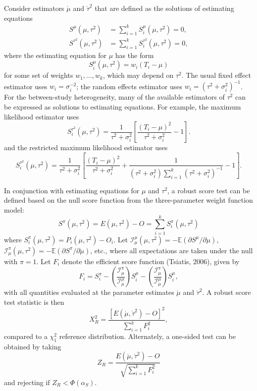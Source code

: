 \documentclass[man,floatsintext]{apa6}
\begin{document}
Consider estimators \(\acute\mu\) and \(\acute\tau^2\) that are defined as the solutions of estimating equations
\[
\begin{aligned}
S^\mu\left(\mu, \tau^2\right) &= \sum_{i=1}^k S^\mu_i \left(\mu, \tau^2\right) = 0, \\
S^{\tau^2}\left(\mu, \tau^2\right) &= \sum_{i=1}^k S^{\tau^2}_i \left(\mu, \tau^2\right) = 0,
\end{aligned}
\]
where the estimating equation for \(\mu\) has the form
\[
S_i^\mu(\mu, \tau^2) = w_i (T_i - \mu)
\]
for some set of weights \(w_1,...,w_k\), which may depend on \(\tau^2\).
The usual fixed effect estimator uses \(w_i = \sigma_i^{-2}\); the random effects estimator uses \(w_i = \left(\tau^2 + \sigma_i^2\right)^{-1}\).
For the between-study heterogeneity, many of the available estimators of \(\tau^2\) can be expressed as solutions to estimating equations.
For example, the maximum likelihood estimator uses
\[
S_i^{\tau^2}(\mu,\tau^2) = \frac{1}{\tau^2 + \sigma_i^2} \left[\frac{(T_i - \mu)^2}{\tau^2 + \sigma_i^2} - 1\right].
\]
and the restricted maximum likelihood estimator uses
\[
S_i^{\tau^2}(\mu,\tau^2) = \frac{1}{\tau^2 + \sigma_i^2} \left[\frac{(T_i - \mu)^2}{\tau^2 + \sigma_i^2} + \frac{1}{\left(\tau^2 + \sigma_i^2\right)\sum_{i=1}^k \left(\tau^2 + \sigma_i^2\right)^{-1}}- 1\right].
\]

In conjunction with estimating equations for \(\mu\) and \(\tau^2\), a robust score test can be defined based on the null score function from the three-parameter weight function model:
\[
S^\pi\left(\mu, \tau^2\right) = E(\mu, \tau^2) - O = \sum_{i=1}^k S^\pi_i\left(\mu, \tau^2\right)
\]
where \(S^\pi_i\left(\mu, \tau^2\right) = P_i(\mu, \tau^2) - O_i\). Let \(\mathcal{I}^\mu_\mu(\mu, \tau^2) = -\mathbb{E}\left(\partial S^\mu / \partial \mu\right)\), \(\mathcal{I}^\pi_\mu(\mu, \tau^2) = -\mathbb{E}\left(\partial S^\pi / \partial \mu\right)\), etc., where all expectations are taken under the null with \(\pi = 1\). Let \(F_i\) denote the efficient score function (Tsiatis, 2006), given by
\[
F_i = S^\pi_i - \left(\frac{\mathcal{I}^\pi_\mu}{\mathcal{I}^\mu_\mu}\right) S^\mu_i - \left(\frac{\mathcal{I}^\pi_\mu}{\mathcal{I}^\mu_\mu}\right) S^\mu_i,
\]
with all quantities evaluated at the parameter estimates \(\acute\mu\) and \(\acute\tau^2\). A robust score test statistic is then
\begin{equation}
X^2_R = \frac{\left[E(\acute\mu, \acute\tau^2) - O\right]^2}{\sum_{i=1}^k F_i^2},
\label{eq:robust-score}
\end{equation}
compared to a \(\chi^2_1\) reference distribution. Alternately, a one-sided test can be obtained by taking
\begin{equation}
Z_R = \frac{E(\acute\mu, \acute\tau^2) - O}{\sqrt{\sum_{i=1}^k F_i^2}}
\end{equation}
and rejecting if \(Z_R < \Phi(\alpha_S)\).
\end{document}
